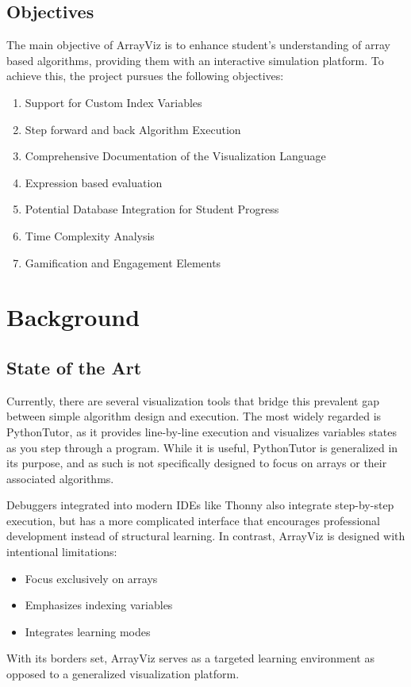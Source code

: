 \documentclass{IEEEtran}
\begin{document}
\subsection{Objectives}
The main objective of ArrayViz is to enhance student's understanding of array based algorithms, providing them with an interactive simulation platform. To achieve this, the project pursues the following objectives:
\begin{enumerate}
    \item {Support for Custom Index Variables}
    \item {Step forward and back Algorithm Execution}
    \item {Comprehensive Documentation of the Visualization Language}
    \item Expression based evaluation
    \item {Potential Database Integration for Student Progress}
    \item {Time Complexity Analysis}
    \item {Gamification and Engagement Elements}
\end{enumerate}
\section{Background}
\subsection{State of the Art}
Currently, there are several visualization tools that bridge this prevalent gap between simple algorithm design and execution. The most widely regarded is PythonTutor, as it provides line-by-line execution and visualizes variables states as you step through a program. While it is useful, PythonTutor is generalized in its purpose, and as such is not specifically designed to focus on arrays or their associated algorithms.

Debuggers integrated into modern IDEs like Thonny also integrate step-by-step execution, but has a more complicated interface that encourages professional development instead of structural learning. In contrast, ArrayViz is designed with intentional limitations: 
\begin{itemize}
    \item Focus exclusively on arrays
    \item Emphasizes indexing variables
    \item Integrates learning modes
\end{itemize}
With its borders set, ArrayViz serves as a targeted learning environment as opposed to a generalized visualization platform.
\end{document}

